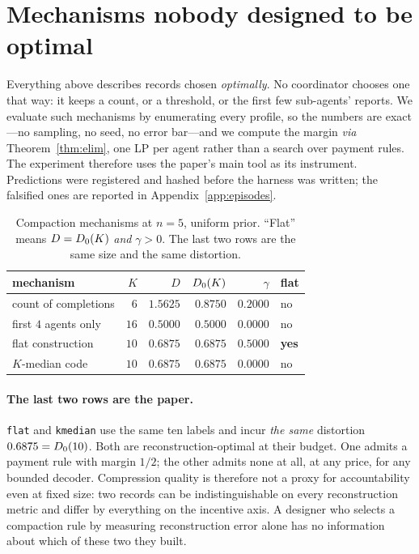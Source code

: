\section{Mechanisms nobody designed to be optimal}
\label{sec:experiment}

Everything above describes records chosen \emph{optimally}. No coordinator
chooses one that way: it keeps a count, or a threshold, or the first few
sub-agents' reports. We evaluate such mechanisms by enumerating every profile, so
the numbers are exact---no sampling, no seed, no error bar---and we compute the
margin \emph{via} Theorem~\ref{thm:elim}, one LP per agent rather than a search
over payment rules. The experiment therefore uses the paper's main tool as its
instrument. Predictions were registered and hashed before the harness was
written; the falsified ones are reported in Appendix~\ref{app:episodes}.

\begin{table}[t]
\centering
\caption{Compaction mechanisms at $n = 5$, uniform prior. ``Flat'' means
$D = D_0(K)$ \emph{and} $\gamma > 0$. The last two rows are the same size and
the same distortion.}
\label{tab:compact}
\small
\begin{tabular}{@{}lrrrrl@{}}
\toprule
mechanism & $K$ & $D$ & $D_0(K)$ & $\gamma$ & flat \\
\midrule
count of completions & $6$  & $1.5625$ & $0.8750$ & $0.2000$ & no \\
first $4$ agents only & $16$ & $0.5000$ & $0.5000$ & $0.0000$ & no \\
\midrule
flat construction & $10$ & $0.6875$ & $0.6875$ & $0.5000$ & \textbf{yes} \\
$K$-median code   & $10$ & $0.6875$ & $0.6875$ & $0.0000$ & no \\
\bottomrule
\end{tabular}
\end{table}

\paragraph{The last two rows are the paper.}
\texttt{flat} and \texttt{kmedian} use the same ten labels and incur \emph{the
same} distortion $0.6875 = D_0(10)$. Both are reconstruction-optimal at their
budget. One admits a payment rule with margin $1/2$; the other admits none at
all, at any price, for any bounded decoder. Compression quality is therefore not
a proxy for accountability even at fixed size: two records can be
indistinguishable on every reconstruction metric and differ by everything on the
incentive axis. A designer who selects a compaction rule by measuring
reconstruction error alone has no information about which of these two they
built.

